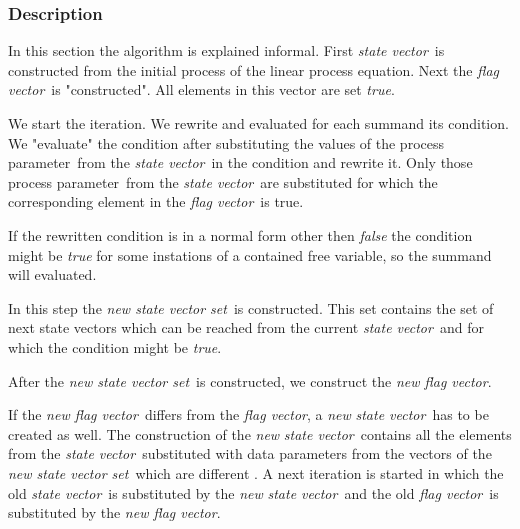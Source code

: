 \documentclass[a4paper,10pt]{article}
\theoremstyle{plain}
\theoremstyle{definition}
\newcommand{\lpe}{linear process equation}
\newcommand{\pp}{process parameter}
\newcommand{\pps}{process parameters}
\newcommand{\ti}{\textit}
\newcommand{\sv}{\textit{state vector}}
\newcommand{\fv}{\textit{flag vector}}
\newcommand{\svs}{\textit{new state vector set}}
\newcommand{\nfv}{\textit{new flag vector}}
\begin{document}
\subsubsection{Description}\label{sss:desc}
In this section the algorithm is explained informal. First \sv\ is constructed from the initial process of the \lpe . Next the \fv\ is "constructed".
All elements in this vector are set \ti{true}.

We start the iteration. We rewrite and evaluated for each summand its condition. We "evaluate" the condition after substituting the values of the \pp\ from the \sv\ in the condition and rewrite it. Only those \pp\ from the \sv\ are substituted for which the corresponding element in the \fv\ is true. 

If the rewritten condition is in a normal form other then \ti{false} the condition might be \ti{true} for some instations of a contained free variable, so the summand will evaluated. 

In this step the \svs\ is constructed. This set contains the set of next state vectors which can be reached from the current \sv\ and for which the condition might be \ti{true}. 

After the \svs\ is constructed, we construct the \nfv . 


 
If the \nfv\ differs from the \fv , a \ti{new} \sv\ has to be created as well. The construction of the \ti{new} \sv\ contains all the elements from the \sv\ substituted with data parameters from the vectors of the \svs\ which are different . 
A next iteration is started in which the old \sv\ is substituted by the \ti{new} \sv\ and the old \fv\ is substituted by the \nfv .
  
\end{document}
